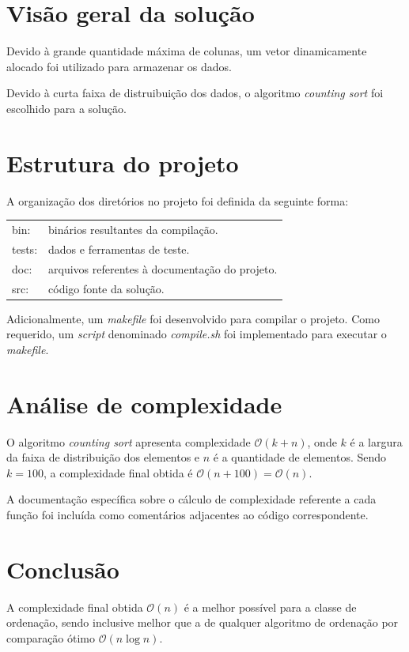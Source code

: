\documentclass{article}
\begin{document}
\section{Visão geral da solução}
Devido à grande quantidade máxima de colunas, um vetor dinamicamente alocado foi utilizado para armazenar os dados.

Devido à curta faixa de distruibuição dos dados, o algoritmo \textit{counting sort} foi escolhido para a solução.


\section{Estrutura do projeto}
A organização dos diretórios no projeto foi definida da seguinte forma:

\begin{tabular}{ll}
  bin:& binários resultantes da compilação.\\
  tests:& dados e ferramentas de teste.\\
  doc:& arquivos referentes à documentação do projeto.\\
  src:& código fonte da solução.
\end{tabular}

Adicionalmente, um \textit{makefile} foi desenvolvido para compilar o projeto. Como requerido, um \textit{script} denominado \textit{compile.sh} foi implementado para executar o \textit{makefile}.


\section{Análise de complexidade}
O algoritmo \textit{counting sort} apresenta complexidade $\mathcal{O}(k + n)$, onde $k$ é a largura da faixa de distribuição dos elementos e $n$ é a quantidade de elementos.
Sendo $k = 100$, a complexidade final obtida é $\mathcal{O}(n + 100) = \mathcal{O}(n)$.

A documentação específica sobre o cálculo de complexidade referente a cada função foi incluída como comentários adjacentes ao código correspondente.


\section{Conclusão}
A complexidade final obtida $\mathcal{O}(n)$ é a melhor possível para a classe de ordenação, sendo inclusive melhor que a de qualquer algoritmo de ordenação por comparação ótimo $\mathcal{O}(n \log n)$.
\end{document}
